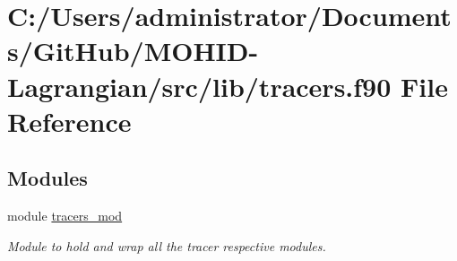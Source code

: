 \hypertarget{tracers_8f90}{}\section{C\+:/\+Users/administrator/\+Documents/\+Git\+Hub/\+M\+O\+H\+I\+D-\/\+Lagrangian/src/lib/tracers.f90 File Reference}
\label{tracers_8f90}
\subsection*{Modules}
\begin{DoxyCompactItemize}
\item 
module \mbox{\hyperlink{namespacetracers__mod}{tracers\+\_\+mod}}
\begin{DoxyCompactList}\small\item\em Module to hold and \textquotesingle{}wrap\textquotesingle{} all the tracer respective modules. \end{DoxyCompactList}\end{DoxyCompactItemize}
